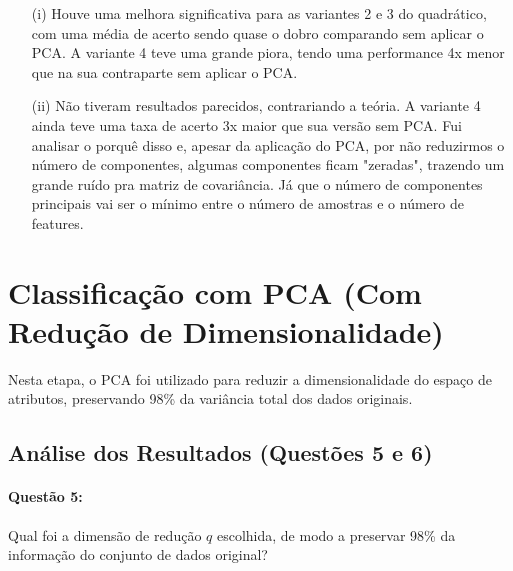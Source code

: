 \documentclass[a4paper, 12pt]{article}
\begin{document}
\begin{itemize}
    \item[(i)] Houve uma melhora significativa para as variantes 2 e 3 do quadrático, com uma média de acerto
        sendo quase o dobro comparando sem aplicar o PCA. A variante 4 teve uma grande piora, tendo uma performance
        4x menor que na sua contraparte sem aplicar o PCA.
    \item[(ii)] Não tiveram resultados parecidos, contrariando a teória. A variante 4 ainda teve uma taxa de acerto
        3x maior que sua versão sem PCA. 
        Fui analisar o porquê disso e, apesar da aplicação do PCA, por não reduzirmos o número de componentes,
        algumas componentes ficam "zeradas", trazendo um grande ruído pra matriz de covariância. Já que o número
        de componentes principais vai ser o mínimo entre o número de amostras e o número de features.
\end{itemize}


\section{Classificação com PCA (Com Redução de Dimensionalidade)}
Nesta etapa, o PCA foi utilizado para reduzir a dimensionalidade do espaço de atributos, preservando 98\% da variância total dos dados originais.

\subsection*{Análise dos Resultados (Questões 5 e 6)}
\paragraph{Questão 5:} Qual foi a dimensão de redução $q$ escolhida, de modo a preservar 98\% da informação do conjunto de dados original?
\end{document}
